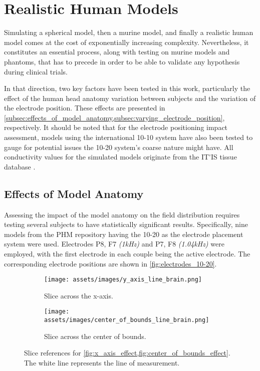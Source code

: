 \section{Realistic Human Models}
\label{sec:realistic_human_models}

Simulating a spherical model, then a murine model, and finally a realistic human model comes at the cost of exponentially increasing complexity. Nevertheless, it constitutes an essential process, along with testing on murine models and phantoms, that has to precede in order to be able to validate any hypothesis during clinical trials.

In that direction, two key factors have been tested in this work, particularly the effect of the human head anatomy variation between subjects and the variation of the electrode position. These effects are presented in \cref{subsec:effects_of_model_anatomy,subsec:varying_electrode_position}, respectively. It should be noted that for the electrode positioning impact assessment, models using the international 10-10 system have also been tested to gauge for potential issues the 10-20 system's coarse nature might have. All conductivity values for the simulated models originate from the \gls{IT'IS} tissue database \cite{ITstissue}.

\subsection{Effects of Model Anatomy}
\label{subsec:effects_of_model_anatomy}

Assessing the impact of the model anatomy on the field distribution requires testing several subjects to have statistically significant results. Specifically, nine models from the \gls{PHM} repository \cite{ErikG.Lee2016} having the 10-20 as the electrode placement system were used. Electrodes P8, F7 \textit{(1\si{kHz})} and P7, F8 \textit{(1.04\si{kHz})} were employed, with the first electrode in each couple being the active electrode. The corresponding electrode positions are shown in \autoref{fig:electrodes_10-20}.

\begin{figure}[H]
    \centering
    \begin{subfigure}[b]{0.49\textwidth}
        \texttt{[image: assets/images/y\_axis\_line\_brain.png]}
        \caption{Slice across the x-axis.}
        \label{fig:brain_slice_for_effects_x}
    \end{subfigure}
    \begin{subfigure}[b]{0.49\textwidth}
        \texttt{[image: assets/images/center\_of\_bounds\_line\_brain.png]}
        \caption{Slice across the center of bounds.}
        \label{fig:brain_slice_for_effects_cf}
    \end{subfigure}
    \caption{Slice references for \cref{fig:x_axis_effect,fig:center_of_bounds_effect}. The white line represents the line of measurement.}
    \label{fig:brain_slice_for_effects}
\end{figure}

